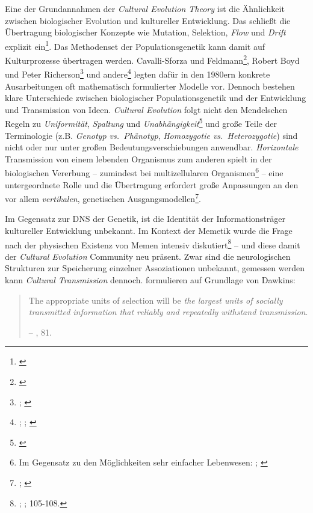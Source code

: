 \documentclass[openany,twoside,twocolumn]{book}
\let\rmarkdownfootnote\footnote%
\def\footnote{\protect\rmarkdownfootnote}
\begin{document}
Eine der Grundannahmen der \emph{Cultural Evolution Theory} ist die
Ähnlichkeit zwischen biologischer Evolution und kultureller Entwicklung.
Das schließt die Übertragung biologischer Konzepte wie Mutation,
Selektion, \emph{Flow} und \emph{Drift} explizit ein\footnote{\textcite{smith_cultural_1992}}.
Das Methodenset der Populationsgenetik kann damit auf Kulturprozesse
übertragen werden. Cavalli-Sforza und Feldmann\footnote{\textcite{cavalli-sforza_cultural_1981}},
Robert Boyd und Peter Richerson\footnote{\textcite{richerson_dual_1978};
  \textcite{boyd_culture_1985}} und andere\footnote{\textcite{campbell_variation_1965};
  \textcite{pulliam_programmed_1980}; \textcite{lumsden_genes_1981}}
legten dafür in den 1980ern konkrete Ausarbeitungen oft mathematisch
formulierter Modelle vor. Dennoch bestehen klare Unterschiede zwischen
biologischer Populationsgenetik und der Entwicklung und Transmission von
Ideen. \emph{Cultural Evolution} folgt nicht den Mendelschen Regeln zu
\emph{Uniformität}, \emph{Spaltung} und \emph{Unabhängigkeit}\footnote{\textcite{mesoudi_pursuing_2017}}
und große Teile der Terminologie (z.B. \emph{Genotyp vs.~Phänotyp},
\emph{Homozygotie vs.~Heterozygotie}) sind nicht oder nur unter großen
Bedeutungsverschiebungen anwendbar. \emph{Horizontale} Transmission von
einem lebenden Organismus zum anderen spielt in der biologischen
Vererbung -- zumindest bei multizellularen Organismen\footnote{Im
  Gegensatz zu den Möglichkeiten sehr einfacher Lebenwesen:
  \textcite{woese_new_2004}; \textcite{woese_interpreting_2000}} -- eine
untergeordnete Rolle und die Übertragung erfordert große Anpassungen an
den vor allem \emph{vertikalen}, genetischen Ausgangsmodellen\footnote{\textcite{cavalli-sforza_cultural_1973};
  \textcite{feldman_cultural_1976}}.

Im Gegensatz zur DNS der Genetik, ist die Identität der
Informationsträger kultureller Entwicklung unbekannt. Im Kontext der
Memetik wurde die Frage nach der physischen Existenz von Memen intensiv
diskutiert\footnote{\textcite{delius_nature_1991};
  \textcite{wilkinson_memes_1999}; \textcite{blackmore_macht_2000}
  105-108.} -- und diese damit der \emph{Cultural Evolution} Community
neu präsent. Zwar sind die neurologischen Strukturen zur Speicherung
einzelner Assoziationen unbekannt, gemessen werden kann \emph{Cultural
Transmission} dennoch. \textcite{pocklington_cultural_1997} formulieren
auf Grundlage von Dawkins:

\begin{quote}
The appropriate units of selection will be \emph{the largest units of
socially transmitted information that reliably and repeatedly withstand
transmission}.

-- \textcite{pocklington_cultural_1997}, 81.
\end{quote}
\end{document}
